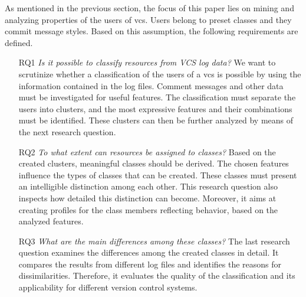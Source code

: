 
As mentioned in the previous section, the focus of this paper lies on mining and analyzing properties of the users of \gls{vcs}. Users belong to preset classes and they commit message styles. Based on this assumption, the following requirements are defined.


\begin{itemize} %
      
\item[RQ1] \textit{Is it possible to classify resources from VCS log data?} 
We want to scrutinize whether a classification of the users of a \gls{vcs} is possible by using the information contained in the log files. Comment messages and other data must be investigated for useful features. The classification must separate the users into clusters, and the most expressive features and their combinations must be identified.  These clusters can then be further analyzed by means of the next research question.

\item[RQ2] \textit{To what extent can resources be assigned to classes?}
Based on the created clusters, meaningful classes should be derived. The chosen features influence the types of classes that can be created. These classes must present an intelligible distinction among each other. This research question also inspects how detailed this distinction can become. Moreover, it aims at creating profiles for the class members reflecting behavior, based on the analyzed features.

\item[RQ3] \textit{What are the main differences among these classes?}
The last research question examines the differences among the created classes in detail. It compares the results from different log files and identifies the reasons for dissimilarities. Therefore, it evaluates the quality of the classification and its applicability for different version control systems.

\end{itemize}

